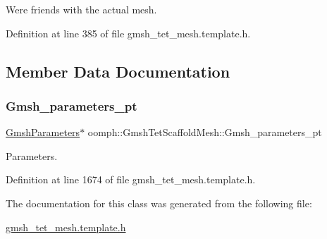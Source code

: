 We\textquotesingle{}re friends with the actual mesh. 



Definition at line 385 of file gmsh\+\_\+tet\+\_\+mesh.\+template.\+h.



\subsection{Member Data Documentation}
\mbox{\label{classoomph_1_1GmshTetScaffoldMesh_afce3676b4f42501024ba1a933f04600d}} 
\subsubsection{\texorpdfstring{Gmsh\+\_\+parameters\+\_\+pt}{Gmsh\_parameters\_pt}}
{\footnotesize\ttfamily \hyperlink{classoomph_1_1GmshParameters}{Gmsh\+Parameters}$\ast$ oomph\+::\+Gmsh\+Tet\+Scaffold\+Mesh\+::\+Gmsh\+\_\+parameters\+\_\+pt\hspace{0.3cm}{\ttfamily [private]}}



Parameters. 



Definition at line 1674 of file gmsh\+\_\+tet\+\_\+mesh.\+template.\+h.



The documentation for this class was generated from the following file\+:\begin{DoxyCompactItemize}
\item 
\hyperlink{gmsh__tet__mesh_8template_8h}{gmsh\+\_\+tet\+\_\+mesh.\+template.\+h}\end{DoxyCompactItemize}
